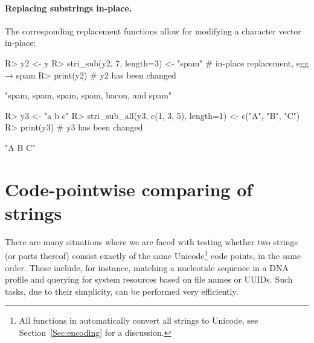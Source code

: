 \documentclass[nojss]{jss}\usepackage[]{graphicx}\usepackage[]{color}
\begin{document}
\paragraph{Replacing substrings in-place.}
The corresponding {replacement functions} allow for modifying
a character vector in-place:

\begin{Schunk}
\begin{Sinput}
R> y2 <- y
R> stri_sub(y2, 7, length=3) <- "spam"  # in-place replacement, egg → spam
R> print(y2)                            # y2 has been changed
\end{Sinput}
\begin{Soutput}
[1] "spam, spam, spam, spam, bacon, and spam"
\end{Soutput}
\end{Schunk}

\begin{Schunk}
\begin{Sinput}
R> y3 <- "a b c"
R> stri_sub_all(y3, c(1, 3, 5), length=1) <- c("A", "B", "C")
R> print(y3)                            # y3 has been changed
\end{Sinput}
\begin{Soutput}
[1] "A B C"
\end{Soutput}
\end{Schunk}



\clearpage



\section{Code-pointwise comparing of strings}\label{Sec:fixed}

There are many situations where we are faced with testing whether two strings
(or parts thereof)
consist exactly of the same Unicode\footnote{All functions in 
automatically convert all  strings
to Unicode, see Section~\ref{Sec:encoding} for a discussion.} code points, in the same order.
These include, for instance, matching a nucleotide sequence
in a DNA profile and querying for system resources based on file names or UUIDs.
Such tasks, due to their simplicity, can be performed very efficiently.
\end{document}
